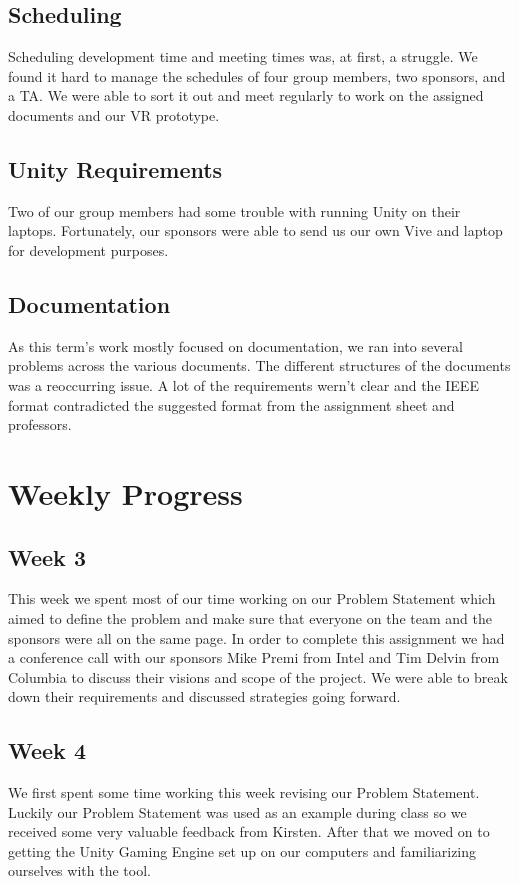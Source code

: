 \documentclass[10pt,journal,compsoc,onecolumn, draftclsnofoot]{IEEEtran}
\begin{document}
\subsection{Scheduling}
Scheduling development time and meeting times was, at first, a struggle.
We found it hard to manage the schedules of four group members, two sponsors, and a TA.
We were able to sort it out and meet regularly to work on the assigned documents and our VR prototype.
\subsection{Unity Requirements}
Two of our group members had some trouble with running Unity on their laptops.
Fortunately, our sponsors were able to send us our own Vive and laptop for development purposes.
\subsection{Documentation}
As this term's work mostly focused on documentation, we ran into several problems across the various documents.
The different structures of the documents was a reoccurring issue.
A lot of the requirements wern't clear and the IEEE format contradicted the suggested format from the assignment sheet and professors.


\section{Weekly Progress}
\subsection{Week 3}
This week we spent most of our time working on our Problem Statement which aimed to define the problem and make sure that everyone on the team and the sponsors were all on the same page.
In order to complete this assignment we had a conference call with our sponsors Mike Premi from Intel and Tim Delvin from Columbia to discuss their visions and scope of the project.
We were able to break down their requirements and discussed strategies going forward.

\subsection{Week 4}
We first spent some time working this week revising our Problem Statement.
Luckily our Problem Statement was used as an example during class so we received some very valuable feedback from Kirsten.
After that we moved on to getting the Unity Gaming Engine set up on our computers and familiarizing ourselves with the tool.
\end{document}

